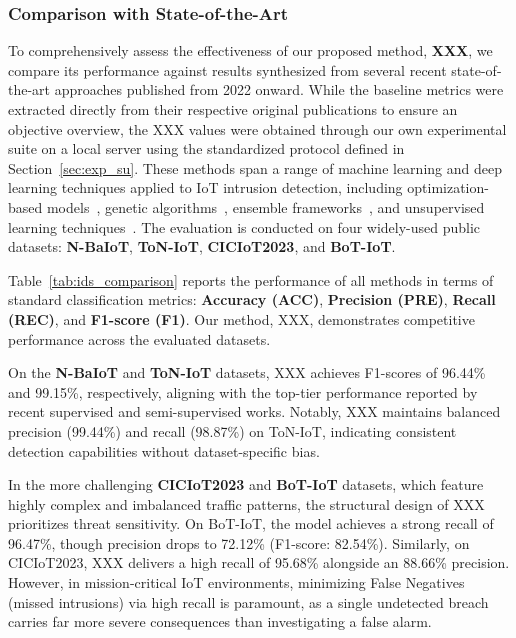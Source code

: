 \documentclass[final,twocolumn,10pt]{elsarticle}
\begin{document}
\subsubsection{Comparison with State-of-the-Art}

To comprehensively assess the effectiveness of our proposed method, \textbf{XXX}, we compare its performance against results synthesized from several recent state-of-the-art approaches published from 2022 onward. While the baseline metrics were extracted directly from their respective original publications to ensure an objective overview, the XXX values were obtained through our own experimental suite on a local server using the standardized protocol defined in Section~\ref{sec:exp_su}. These methods span a range of machine learning and deep learning techniques applied to IoT intrusion detection, including optimization-based models~\cite{aktar2024robust}, genetic algorithms~\cite{saiyed2024genetic}, ensemble frameworks~\cite{golestani2024device}, and unsupervised learning techniques~\cite{segurola2024unsupervised}. The evaluation is conducted on four widely-used public datasets: \textbf{N-BaIoT}, \textbf{ToN-IoT}, \textbf{CICIoT2023}, and \textbf{BoT-IoT}.


Table~\ref{tab:ids_comparison} reports the performance of all methods in terms of standard classification metrics: \textbf{Accuracy (ACC)}, \textbf{Precision (PRE)}, \textbf{Recall (REC)}, and \textbf{F1-score (F1)}. Our method, XXX, demonstrates competitive performance across the evaluated datasets.

On the \textbf{N-BaIoT} and \textbf{ToN-IoT} datasets, XXX achieves F1-scores of 96.44\% and 99.15\%, respectively, aligning with the top-tier performance reported by recent supervised and semi-supervised works. Notably, XXX maintains balanced precision (99.44\%) and recall (98.87\%) on ToN-IoT, indicating consistent detection capabilities without dataset-specific bias.

In the more challenging \textbf{CICIoT2023} and \textbf{BoT-IoT} datasets, which feature highly complex and imbalanced traffic patterns, the structural design of XXX prioritizes threat sensitivity. On BoT-IoT, the model achieves a strong recall of 96.47\%, though precision drops to 72.12\% (F1-score: 82.54\%). Similarly, on CICIoT2023, XXX delivers a high recall of 95.68\% alongside an 88.66\% precision. However, in mission-critical IoT environments, minimizing False Negatives (missed intrusions) via high recall is paramount, as a single undetected breach carries far more severe consequences than investigating a false alarm.
\end{document}
